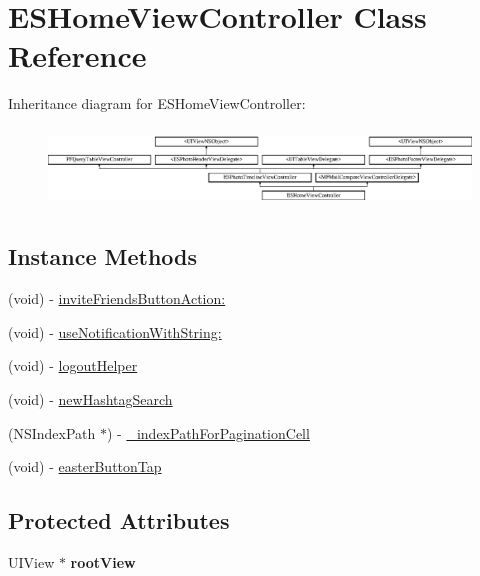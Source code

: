 \hypertarget{interface_e_s_home_view_controller}{}\section{E\+S\+Home\+View\+Controller Class Reference}
\label{interface_e_s_home_view_controller}
Inheritance diagram for E\+S\+Home\+View\+Controller\+:\begin{figure}[H]
\begin{center}
\leavevmode
\includegraphics[height=2.129278cm]{interface_e_s_home_view_controller}
\end{center}
\end{figure}
\subsection*{Instance Methods}
\begin{DoxyCompactItemize}
\item 
(void) -\/ \hyperlink{interface_e_s_home_view_controller_ab6aa4a28d8b6fa9330bda0e0495bd711}{invite\+Friends\+Button\+Action\+:}
\item 
(void) -\/ \hyperlink{interface_e_s_home_view_controller_a61455e5b2a4944bcebb37f5caf3faa4d}{use\+Notification\+With\+String\+:}
\item 
(void) -\/ \hyperlink{interface_e_s_home_view_controller_a239620c2a466be632318a621e868a78a}{logout\+Helper}
\item 
(void) -\/ \hyperlink{interface_e_s_home_view_controller_a679471b20d705682619baf51f91b8788}{new\+Hashtag\+Search}
\item 
(N\+S\+Index\+Path $\ast$) -\/ \hyperlink{interface_e_s_home_view_controller_a2e200bad2b04827613b11664e30ad977}{\+\_\+index\+Path\+For\+Pagination\+Cell}
\item 
(void) -\/ \hyperlink{interface_e_s_home_view_controller_aae46eb258ab19c8ec8e8a0fa21e8ea9e}{easter\+Button\+Tap}
\end{DoxyCompactItemize}
\subsection*{Protected Attributes}
\begin{DoxyCompactItemize}
\item 
\hypertarget{interface_e_s_home_view_controller_ad405963b89a02d36b7cc0a358d722dc4}{}U\+I\+View $\ast$ {\bfseries root\+View}\label{interface_e_s_home_view_controller_ad405963b89a02d36b7cc0a358d722dc4}

\end{DoxyCompactItemize}
